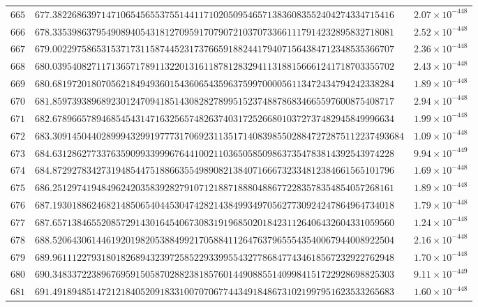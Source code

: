 \documentclass[12pt,reqno]{amsart}
\theoremstyle{remark}
\begin{document}
\begin{longtable}{clc}
$665$ & $677.3822686397147106545655375514411710205095465713836083552404274334715416$ & $2.07\times 10^{-448}$ \\
$666$ & $678.3353986379549089405431812709591707907210370733661117914232895832718081$ & $2.52\times 10^{-448}$ \\
$667$ & $679.0022975865315371731158744523173766591882441794071564384712348535366707$ & $2.36\times 10^{-448}$ \\
$668$ & $680.0395408271171365717891132201316118781283294113188156661241718703355702$ & $2.43\times 10^{-448}$ \\
$669$ & $680.6819720180705621849493601543606543596375997000056113472434794242338284$ & $1.89\times 10^{-448}$ \\
$670$ & $681.8597393896892301247094185143082827899515237488786834665597600875408717$ & $2.94\times 10^{-448}$ \\
$671$ & $682.6789665789468545431471632565748263740317252668010372737482945849996634$ & $1.99\times 10^{-448}$ \\
$672$ & $683.309145044028999432991977731706923113517140839855028847272875112237493684$ & $1.09\times 10^{-448}$ \\
$673$ & $684.6312862773376359099339996764410021103650585098637354783814392543974228$ & $9.94\times 10^{-449}$ \\
$674$ & $684.8729278342731948544751886635549890821384071666732334812384661565101796$ & $1.69\times 10^{-448}$ \\
$675$ & $686.2512974194849624203583928279107121887188804886772283578354854057268161$ & $1.89\times 10^{-448}$ \\
$676$ & $687.1930188624682148506540445304742821438499349705627730924247864964734018$ & $1.79\times 10^{-448}$ \\
$677$ & $687.6571384655208572914301645406730831919685020184231126406432604331059560$ & $1.24\times 10^{-448}$ \\
$678$ & $688.5206430614461920198205388499217058841126476379655543540067944008922504$ & $2.16\times 10^{-448}$ \\
$679$ & $689.9611122793180182689432397258522933995543277868477434618567232922762948$ & $1.70\times 10^{-448}$ \\
$680$ & $690.3483372238967695915058702882381857601449088551409984151722928698825303$ & $9.11\times 10^{-449}$ \\
$681$ & $691.4918948514721218405209183310070706774434918486731021997951623533265683$ & $1.60\times 10^{-448}$ \\

\end{longtable}
\end{document}
